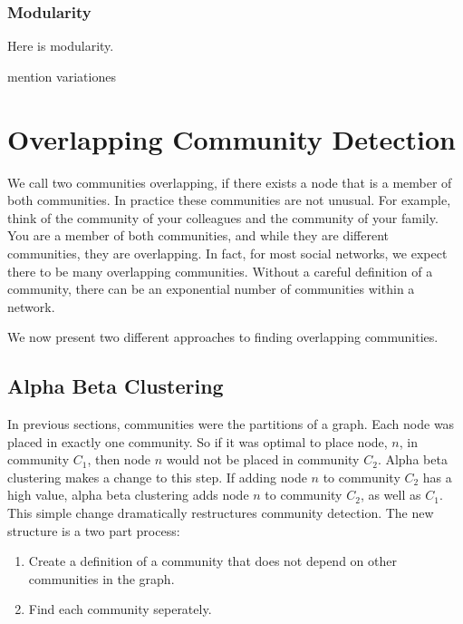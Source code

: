 \documentclass[phd,tocprelim]{cornell}
\begin{document}
\subsubsection{Modularity}

Here is modularity.

mention variationes


\section{Overlapping Community Detection}

We call two communities overlapping, if there exists a node that is a member of both communities.  In practice these communities are not unusual.  For example, think of the community of your colleagues and the community of your family. You are a member of both communities, and while they are different communities, they are overlapping.  In fact, for most social networks, we expect there to be many overlapping communities.  Without a careful definition of a community, there can be an exponential number of communities within a network.

We now present two different approaches to finding overlapping communities.

\subsection{Alpha Beta Clustering}

In previous sections, communities were the partitions of a graph.  Each node was placed in exactly one community.  So if it was optimal to place node, $n$, in community $C_1$, then node $n$ would not be placed in community $C_2$.  Alpha beta clustering makes a change to this step.  If adding node $n$ to community $C_2$ has a high value, alpha beta clustering adds node $n$ to community $C_2$, as well as $C_1$.  This simple change dramatically restructures community detection.  The new structure is a two part process:
\begin{enumerate}
\item Create a definition of a community that does not depend on other communities in the graph.
\item Find each community seperately.
\end{enumerate}
\end{document}
